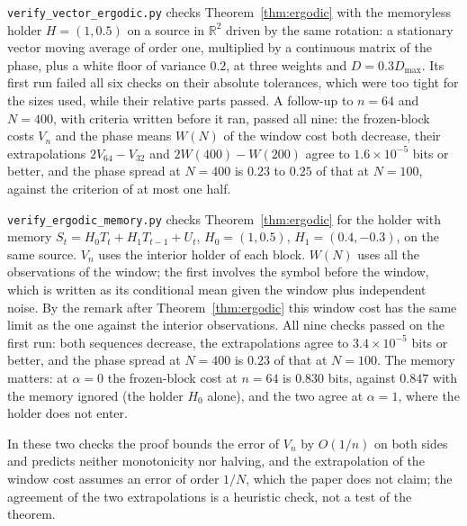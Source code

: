\documentclass[11pt,onecolumn]{IEEEtran}
\newcommand{\R}{\mathbb{R}}
\begin{document}
\texttt{verify\_vector\_ergodic.py} checks Theorem~\ref{thm:ergodic} with
the memoryless holder $H=(1,0.5)$ on a source in $\R^2$ driven by the
same rotation: a stationary vector moving average of order one,
multiplied by a continuous matrix of the phase, plus a white floor of
variance $0.2$, at three weights and $D=0.3D_{\max}$. Its first run failed
all six checks on their absolute tolerances, which were too tight for
the sizes used, while their relative parts passed. A follow-up to
$n=64$ and $N=400$, with criteria written before it ran, passed all
nine: the frozen-block costs $V_n$ and the phase means $W(N)$ of the
window cost both decrease, their extrapolations $2V_{64}-V_{32}$ and
$2W(400)-W(200)$ agree to $1.6\times10^{-5}$ bits or better, and the phase
spread at $N=400$ is $0.23$ to $0.25$ of that at $N=100$, against the
criterion of at most one half.

\texttt{verify\_ergodic\_memory.py} checks Theorem~\ref{thm:ergodic} for the
holder with memory $S_t=H_0T_t+H_1T_{t-1}+U_t$, $H_0=(1,0.5)$,
$H_1=(0.4,-0.3)$, on the same source. $V_n$ uses the interior holder of
each block. $W(N)$ uses all the observations of the window; the first
involves the symbol before the window, which is written as its
conditional mean given the window plus independent noise. By the remark
after Theorem~\ref{thm:ergodic} this window cost has the same limit as
the one against the interior observations. All nine checks passed on
the first run: both sequences decrease, the extrapolations agree to
$3.4\times10^{-5}$ bits or better, and the phase spread at $N=400$ is $0.23$
of that at $N=100$. The memory matters: at $\alpha=0$ the frozen-block cost
at $n=64$ is $0.830$ bits, against $0.847$ with the memory ignored
(the holder $H_0$ alone), and the two agree at $\alpha=1$, where the
holder does not enter.

In these two checks the proof bounds the error of $V_n$ by $O(1/n)$ on
both sides and predicts neither monotonicity nor halving, and the
extrapolation of the window cost assumes an error of order $1/N$, which
the paper does not claim; the agreement of the two extrapolations is a
heuristic check, not a test of the theorem.
\end{document}
